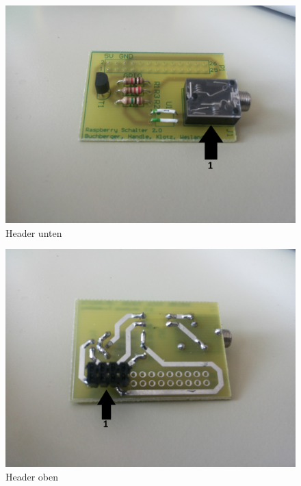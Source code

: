 \begin{figure}[H]
\centering
\includegraphics[keepaspectratio=true, width=13cm]{images/rpi/rpi_header_top.jpg}
\caption{Header unten}
\label{fig:report_hardware_heTo}
\end{figure}
\begin{figure}[H]
\centering
\includegraphics[keepaspectratio=true, width=13cm]{images/rpi/rpi_header_bottom.jpg}
\caption{Header oben}
\label{fig:report_hardware_heBo}
\end{figure}
